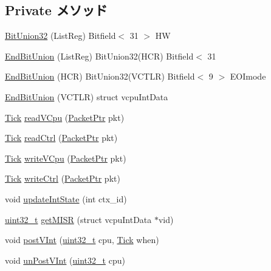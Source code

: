 \subsection*{Private メソッド}
\begin{DoxyCompactItemize}
\item 
\hyperlink{classVGic_a1e2e8270e48d9bf2f00ad8e46726eced}{BitUnion32} (ListReg) Bitfield$<$ 31 $>$ HW
\item 
\hyperlink{classVGic_aa0158cd1ea3c86fc81b16a8d77b8520b}{EndBitUnion} (ListReg) BitUnion32(HCR) Bitfield$<$ 31
\item 
\hyperlink{classVGic_ab5911b67b4abc330297af4d4c7e24204}{EndBitUnion} (HCR) BitUnion32(VCTLR) Bitfield$<$ 9 $>$ EOImode
\item 
\hyperlink{classVGic_a6fc0955a2336f0716e82db0f8ede0101}{EndBitUnion} (VCTLR) struct vcpuIntData
\item 
\hyperlink{base_2types_8hh_a5c8ed81b7d238c9083e1037ba6d61643}{Tick} \hyperlink{classVGic_ae1f51e39d49a7c6129c9092a9fc1f304}{readVCpu} (\hyperlink{classPacket}{PacketPtr} pkt)
\item 
\hyperlink{base_2types_8hh_a5c8ed81b7d238c9083e1037ba6d61643}{Tick} \hyperlink{classVGic_a45a7fc6132e09486475eca0302ab4981}{readCtrl} (\hyperlink{classPacket}{PacketPtr} pkt)
\item 
\hyperlink{base_2types_8hh_a5c8ed81b7d238c9083e1037ba6d61643}{Tick} \hyperlink{classVGic_a289d8279acf224a8745658b053b0c16c}{writeVCpu} (\hyperlink{classPacket}{PacketPtr} pkt)
\item 
\hyperlink{base_2types_8hh_a5c8ed81b7d238c9083e1037ba6d61643}{Tick} \hyperlink{classVGic_ab75ecb383e0dfa786c92077803100348}{writeCtrl} (\hyperlink{classPacket}{PacketPtr} pkt)
\item 
void \hyperlink{classVGic_aa1847a7ae392ebc8637b9ab5d25c4c4b}{updateIntState} (int ctx\_\-id)
\item 
\hyperlink{Type_8hh_a435d1572bf3f880d55459d9805097f62}{uint32\_\-t} \hyperlink{classVGic_aef2af82ff4c26ce727729ce60f587ee3}{getMISR} (struct vcpuIntData $\ast$vid)
\item 
void \hyperlink{classVGic_a8974d873942f37d74bede520fc0d1f1a}{postVInt} (\hyperlink{Type_8hh_a435d1572bf3f880d55459d9805097f62}{uint32\_\-t} cpu, \hyperlink{base_2types_8hh_a5c8ed81b7d238c9083e1037ba6d61643}{Tick} when)
\item 
void \hyperlink{classVGic_a483dd48f21752d469dcd36f3e331184a}{unPostVInt} (\hyperlink{Type_8hh_a435d1572bf3f880d55459d9805097f62}{uint32\_\-t} cpu)
\item 

\end{DoxyCompactItemize}
